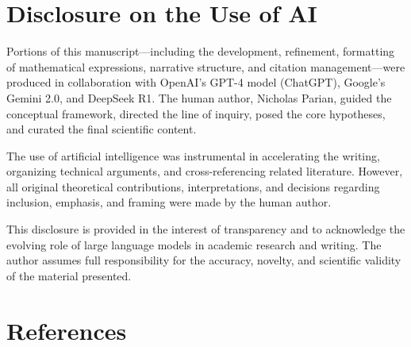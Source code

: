 \documentclass[11pt]{article}
\begin{document}
\section*{Disclosure on the Use of AI}
\label{appendix:disclosure}

Portions of this manuscript—including the development, refinement, formatting of mathematical expressions, narrative structure, and citation management—were produced in collaboration with OpenAI's GPT-4 model (ChatGPT), Google's Gemini 2.0, and DeepSeek R1. The human author, Nicholas Parian, guided the conceptual framework, directed the line of inquiry, posed the core hypotheses, and curated the final scientific content.

The use of artificial intelligence was instrumental in accelerating the writing, organizing technical arguments, and cross-referencing related literature. However, all original theoretical contributions, interpretations, and decisions regarding inclusion, emphasis, and framing were made by the human author.

This disclosure is provided in the interest of transparency and to acknowledge the evolving role of large language models in academic research and writing. The author assumes full responsibility for the accuracy, novelty, and scientific validity of the material presented.


\section*{References}


\end{document}
